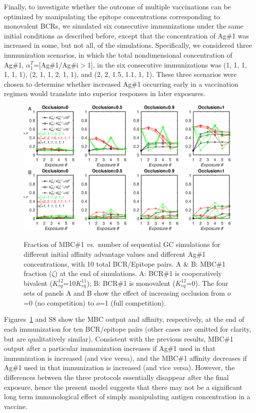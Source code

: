 \documentclass[utf8]{frontiersHLTH}%
\def\vs {{\it vs.}}
\newcommand{\Figs}[2]{Figures~\ref{fig:#1} and~\ref{fig:#2}}
\newcommand{\hfig}[1]{#1} %
\begin{document}
Finally, to investigate whether the outcome of multiple vaccinations can
be optimized by manipulating the epitope concentrations corresponding
to monovalent BCRs, we simulated six consecutive immunizations under the
same initial conditions as described before, except that the
concentration of Ag\#1 was increased in some, but not all, of the simulations.
Specifically, we considered three immunization scenarios, in which the total nondimensional concentration of Ag\#1,
$\alpha^T_1$=[Ag\#1/Ag\#i$>$1], in the six consecutive immunizations was
(1, 1, 1, 1, 1, 1), (2, 1, 1, 2, 1, 1), and (2, 2, 1.5, 1.1, 1, 1). These
three scenarios were chosen to determine whether increased Ag\#1
occurring early in a vaccination regimen would translate into superior
responses in later exposures.
%
\hfig{
\begin{figure}
\centering
\includegraphics[width=0.99\textwidth]{../fig8-S3-S8/mbctime-k12=10.eps}
\includegraphics[width=0.99\textwidth]{../fig8-S3-S8/mbctime-k12=0.eps}
\caption{Fraction of MBC\#1 \vs~number of sequential GC simulations for different initial affinity advantage values
and different Ag\#1 concentrations, with 10 total BCR/Epitope pairs.
A \& B: MBC\#1 fraction ($\zeta$) at the end of simulations.
A: BCR\#1 is cooperatively bivalent ($K^{12}_{eq}$=10$K^{11}_{eq}$);
B: BCR\#1 is monovalent ($K^{12}_{eq}$=0).  
The four sets of panels A and B show the effect of increasing occlusion from $o$=0 (no
competition) to $o$=1 (full competition).
}
\label{fig:agtime}
\end{figure}
}
Figures~\ref{fig:agtime} and S8 show the MBC output and affinity, respectively, at the end of each
immunization for ten BCR/epitope pairs (other cases are omitted for
clarity, but are qualitatively similar). Consistent with the previous
results, MBC\#1 output after a particular immunization increases if
Ag\#1 used in that immunization is increased (and vice versa), and the
MBC\#1 affinity decreases if Ag\#1 used in that immunization is increased
(and vice versa). However, the differences between the three protocols
essentially disappear after the final exposure, hence the present model suggests that there
may not be a significant long term immunological effect of simply
manipulating antigen concentration in a vaccine.
\end{document}
